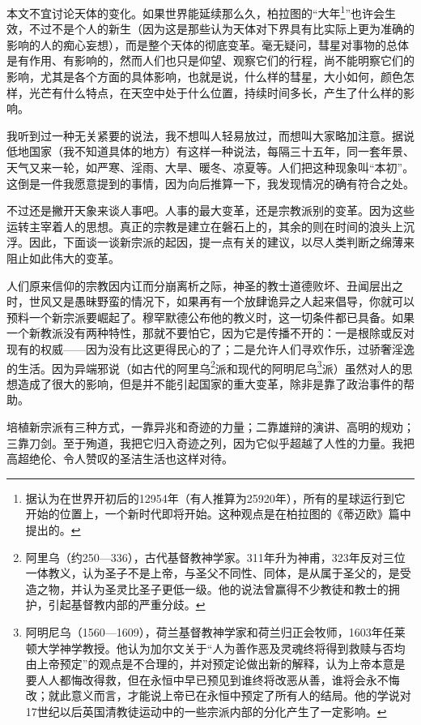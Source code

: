 \par 本文不宜讨论天体的变化。如果世界能延续那么久，柏拉图的“大年\footnote{据认为在世界开初后的12954年（有人推算为25920年），所有的星球运行到它开始的位置上，一个新时代即将开始。这种观点是在柏拉图的《蒂迈欧》篇中提出的。}”也许会生效，不过不是个人的新生（因为这是那些认为天体对下界具有比实际上更为准确的影响的人的痴心妄想），而是整个天体的彻底变革。毫无疑问，彗星对事物的总体是有作用、有影响的，然而人们也只是仰望、观察它们的行程，尚不能明察它们的影响，尤其是各个方面的具体影响，也就是说，什么样的彗星，大小如何，颜色怎样，光芒有什么特点，在天空中处于什么位置，持续时间多长，产生了什么样的影响。
\par 我听到过一种无关紧要的说法，我不想叫人轻易放过，而想叫大家略加注意。据说低地国家（我不知道具体的地方）有这样一种说法，每隔三十五年，同一套年景、天气又来一轮，如严寒、淫雨、大旱、暖冬、凉夏等。人们把这种现象叫“本初”。这倒是一件我愿意提到的事情，因为向后推算一下，我发现情况的确有符合之处。
\par 不过还是撇开天象来谈人事吧。人事的最大变革，还是宗教派别的变革。因为这些运转主宰着人的思想。真正的宗教是建立在磐石上的，其余的则在时间的浪头上沉浮。因此，下面谈一谈新宗派的起因，提一点有关的建议，以尽人类判断之绵薄来阻止如此伟大的变革。
\par 人们原来信仰的宗教因内讧而分崩离析之际，神圣的教士道德败坏、丑闻层出之时，世风又是愚昧野蛮的情况下，如果再有一个放肆诡异之人起来倡导，你就可以预料一个新宗派要崛起了。穆罕默德公布他的教义时，这一切条件都已具备。如果一个新教派没有两种特性，那就不要怕它，因为它是传播不开的：一是根除或反对现有的权威——因为没有比这更得民心的了；二是允许人们寻欢作乐，过骄奢淫逸的生活。因为异端邪说（如古代的阿里乌\footnote{阿里乌（约250—336），古代基督教神学家。311年升为神甫，323年反对三位一体教义，认为圣子不是上帝，与圣父不同性、同体，是从属于圣父的，是受造之物，并认为圣灵比圣子更低一级。他的说法曾赢得不少教徒和教士的拥护，引起基督教内部的严重分歧。}派和现代的阿明尼乌\footnote{阿明尼乌（1560—1609），荷兰基督教神学家和荷兰归正会牧师，1603年任莱顿大学神学教授。他认为加尔文关于“人为善作恶及灵魂终将得到救赎与否均由上帝预定”的观点是不合理的，并对预定论做出新的解释，认为上帝本意是要人人都悔改得救，但在永恒中早已预见到谁终将改恶从善，谁将会永不悔改；就此意义而言，才能说上帝已在永恒中预定了所有人的结局。他的学说对17世纪以后英国清教徒运动中的一些宗派内部的分化产生了一定影响。}派）虽然对人的思想造成了很大的影响，但是并不能引起国家的重大变革，除非是靠了政治事件的帮助。
\par 培植新宗派有三种方式，一靠异兆和奇迹的力量；二靠雄辩的演讲、高明的规劝；三靠刀剑。至于殉道，我把它归入奇迹之列，因为它似乎超越了人性的力量。我把高超绝伦、令人赞叹的圣洁生活也这样对待。
